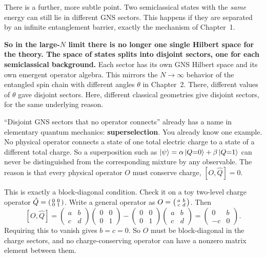 There is a further, more subtle point. Two semiclassical states with the \emph{same} energy can still lie in
different GNS sectors. This happens if they are separated by an infinite entanglement barrier, exactly the
mechanism of Chapter~1.

\textbf{So in the large-$N$ limit there is no longer one single Hilbert space for the theory. The space of
states splits into disjoint sectors, one for each semiclassical background.} Each sector has its own GNS Hilbert
space and its own emergent operator algebra. This mirrors the $N\to\infty$ behavior of the entangled spin chain
with different angles $\theta$ in Chapter~2. There, different values of $\theta$ gave disjoint sectors. Here,
different classical geometries give disjoint sectors, for the same underlying reason.

\begin{physconnect}
``Disjoint GNS sectors that no operator connects'' already has a name in elementary quantum mechanics:
\textbf{superselection}. You already know one example. No physical operator connects a state of one total
electric charge to a state of a different total charge. So a superposition such as
$\ket{\psi}=\alpha\ket{Q{=}0}+\beta\ket{Q{=}1}$ can never be distinguished from the corresponding mixture by any
observable. The reason is that every physical operator $O$ must conserve charge, $[O,\hat Q]=0$.

This is exactly a block-diagonal condition. Check it on a toy two-level charge operator
$\hat Q=\begin{psmallmatrix}0&0\\0&1\end{psmallmatrix}$. Write a general operator as $O=\begin{psmallmatrix}a&b\\c&d
\end{psmallmatrix}$. Then
\[
[O,\hat Q] = \begin{pmatrix}a&b\\c&d\end{pmatrix}\begin{pmatrix}0&0\\0&1\end{pmatrix}
-\begin{pmatrix}0&0\\0&1\end{pmatrix}\begin{pmatrix}a&b\\c&d\end{pmatrix}
= \begin{pmatrix}0&b\\-c&0\end{pmatrix} .
\]
Requiring this to vanish gives $b=c=0$. So $O$ must be block-diagonal in the charge sectors, and no
charge-conserving operator can have a nonzero matrix element between them.


\end{physconnect}
